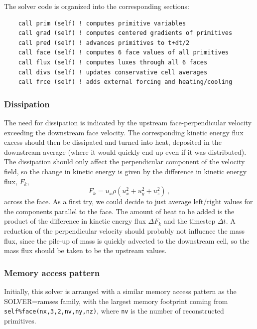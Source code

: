 \documentclass[paper=a4,fontsize=11pt]{scrartcl}
\numberwithin{equation}{section}		%
\numberwithin{figure}{section}			%
\numberwithin{table}{section}				%
\newcommand{\codecolor}{\color{Blue}}
\begin{document}
The solver code is organized into the corresponding sections:
{\small\codecolor\begin{verbatim}
    call prim (self) ! computes primitive variables
    call grad (self) ! computes centered gradients of primitives
    call pred (self) ! advances primitives to t+dt/2
    call face (self) ! computes 6 face values of all primitives
    call flux (self) ! computes luxes through all 6 faces
    call divs (self) ! updates conservative cell averages
    call frce (self) ! adds external forcing and heating/cooling
\end{verbatim}}

\subsubsection{Dissipation}
\def\Fk{F_k}
\def\ux{u_x}
\def\uy{u_y}
\def\uz{u_z}
The need for dissipation is indicated by the upstream face-perpendicular velocity exceeding the downstream face velocity.  The corresponding kinetic energy flux excess should then be dissipated and turned into heat, deposited in the downstream average (where it would quickly end up even if it was distributed).  The dissipation should only affect the perpendicular component of the velocity field, so the change in kinetic energy is given by the difference in kinetic energy flux, $\Fk$,
\begin{equation}
    \Fk = \ux \rho(\ux^2 + \uy^2 + \uz^2) \,,
\end{equation}
across the face.  As a first try, we could decide to just average left/right values for the components parallel to the face.  The amount of heat to be added is the product of the difference in kinetic energy flux $\Delta \Fk$ and the timestep $\Delta t$.  A reduction of the perpendicular velocity should probably not influence the mass flux, since the pile-up of mass is quickly advected to the downstream cell, so the mass flux should be taken to be the upstream values.

\subsubsection{Memory access pattern}
Initially, this solver is arranged with a similar memory access pattern as the SOLVER=ramses family, with the largest memory footprint coming from \verb|self%face(nx,3,2,nv,ny,nz)|, where \verb|nv| is the number of reconstructed primitives.
\end{document}
